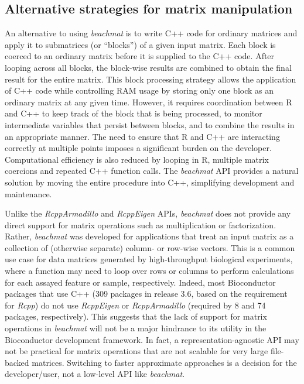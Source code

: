 \documentclass[10pt,letterpaper]{article}
\newcommand{\beachmat}{\textit{beachmat}}
\begin{document}
\subsection*{Alternative strategies for matrix manipulation}
An alternative to using \beachmat{} is to write C++ code for ordinary matrices and apply it to submatrices (or ``blocks'') of a given input matrix.
Each block is coerced to an ordinary matrix before it is supplied to the C++ code.
After looping across all blocks, the block-wise results are combined to obtain the final result for the entire matrix.
This block processing strategy allows the application of C++ code while controlling RAM usage by storing only one block as an ordinary matrix at any given time.
However, it requires coordination between R and C++ to keep track of the block that is being processed, to monitor intermediate variables that persist between blocks, and to combine the results in an appropriate manner.
The need to ensure that R and C++ are interacting correctly at multiple points imposes a significant burden on the developer.
Computational efficiency is also reduced by looping in R, multiple matrix coercions and repeated C++ function calls.
The \beachmat{} API provides a natural solution by moving the entire procedure into C++, simplifying development and maintenance.

Unlike the \textit{RcppArmadillo} and \textit{RcppEigen} APIs, \beachmat{} does not provide any direct support for matrix operations such as multiplication or factorization.
Rather, \beachmat{} was developed for applications that treat an input matrix as a collection of (otherwise separate) column- or row-wise vectors.
This is a common use case for data matrices generated by high-throughput biological experiments, where a function may need to loop over rows or columns to perform calculations for each assayed feature or sample, respectively.
Indeed, most Bioconductor packages that use C++ (309 packages in release 3.6, based on the requirement for \textit{Rcpp}) do not use \textit{RcppEigen} or \textit{RcppArmadillo} (required by 8 and 74 packages, respectively).
This suggests that the lack of support for matrix operations in \beachmat{} will not be a major hindrance to its utility in the Bioconductor development framework.
In fact, a representation-agnostic API may not be practical for matrix operations that are not scalable for very large file-backed matrices.
Switching to faster approximate approaches is a decision for the developer/user, not a low-level API like \beachmat{}.
\end{document}
